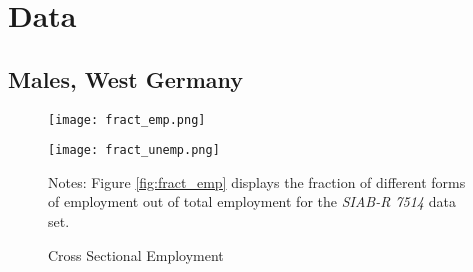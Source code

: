 \documentclass[12pt, a4paper]{article}
\begin{document}
\section{Data}\label{sec:Data}

\subsection{Males, West Germany}

\begin{figure}[!h]
\captionsetup{font=large}
\caption{Cross Sectional Employment}
	\begin{minipage}[b]{0.48\textwidth}
		\centering
		\texttt{[image: fract\_emp.png]}
		\label{fig:fract_emp}
	\end{minipage}
	\begin{minipage}[b]{0.48\textwidth}
		\centering
		\texttt{[image: fract\_unemp.png]}
		\label{fig:fract_unemp}
	\end{minipage}
\footnotesize{
\justifying Notes: Figure \ref{fig:fract_emp} displays the fraction of different forms of employment out of total employment for the \emph{SIAB-R 7514} data set. \par} 
\end{figure}


\end{document}
